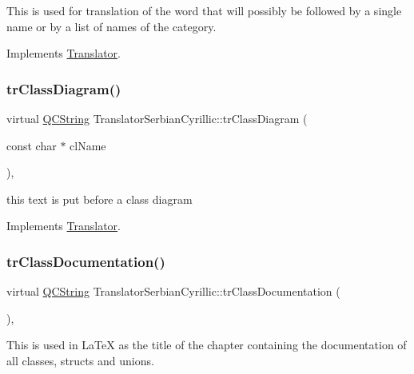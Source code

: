This is used for translation of the word that will possibly be followed by a single name or by a list of names of the category. 

Implements \mbox{\hyperlink{class_translator}{Translator}}.

\mbox{\label{class_translator_serbian_cyrillic_aab6b73d32b61e27327a6846883dfd197}} 
\subsubsection{\texorpdfstring{trClassDiagram()}{trClassDiagram()}}
{\footnotesize\ttfamily virtual \mbox{\hyperlink{class_q_c_string}{Q\+C\+String}} Translator\+Serbian\+Cyrillic\+::tr\+Class\+Diagram (\begin{DoxyParamCaption}\item[{const char $\ast$}]{cl\+Name }\end{DoxyParamCaption})\hspace{0.3cm}{\ttfamily [inline]}, {\ttfamily [virtual]}}

this text is put before a class diagram 

Implements \mbox{\hyperlink{class_translator}{Translator}}.

\mbox{\label{class_translator_serbian_cyrillic_a3e92779ffa151bacd460e616d8670925}} 
\subsubsection{\texorpdfstring{trClassDocumentation()}{trClassDocumentation()}}
{\footnotesize\ttfamily virtual \mbox{\hyperlink{class_q_c_string}{Q\+C\+String}} Translator\+Serbian\+Cyrillic\+::tr\+Class\+Documentation (\begin{DoxyParamCaption}{ }\end{DoxyParamCaption})\hspace{0.3cm}{\ttfamily [inline]}, {\ttfamily [virtual]}}

This is used in La\+TeX as the title of the chapter containing the documentation of all classes, structs and unions. 

